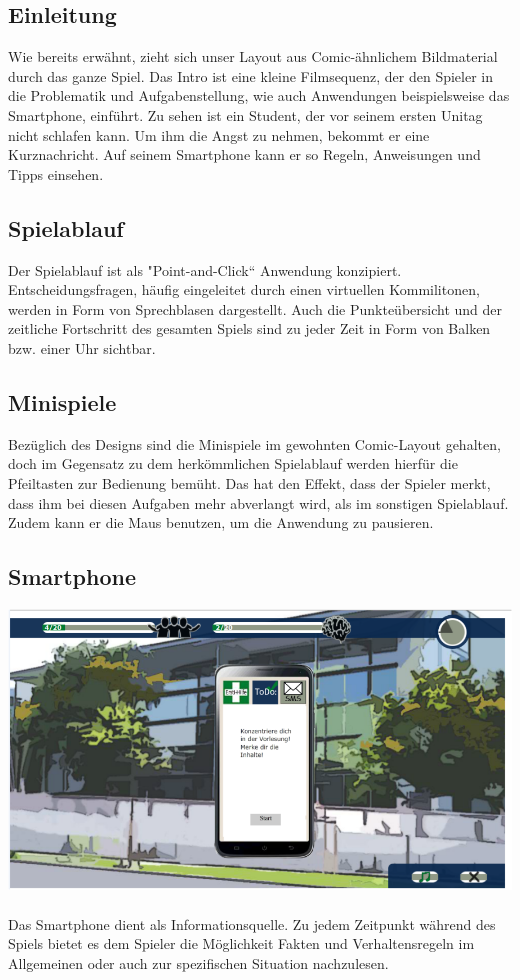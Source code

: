 \documentclass[a4paper, 11pt]{article} %
\begin{document}
\subsection{Einleitung}
Wie bereits erwähnt, zieht sich unser Layout aus Comic-ähnlichem Bildmaterial durch das ganze Spiel. Das Intro ist eine kleine Filmsequenz, der den Spieler in die Problematik und Aufgabenstellung, wie auch Anwendungen beispielsweise das Smartphone, einführt. Zu sehen ist ein Student, der vor seinem ersten Unitag nicht schlafen kann. Um ihm die Angst zu nehmen, bekommt er eine Kurznachricht. Auf seinem Smartphone kann er so Regeln, Anweisungen und Tipps einsehen.

\subsection{Spielablauf}
Der Spielablauf ist als "Point-and-Click“ Anwendung konzipiert. Entscheidungsfragen, häufig eingeleitet durch einen virtuellen Kommilitonen, werden in Form von Sprechblasen dargestellt.
Auch die Punkteübersicht und der zeitliche Fortschritt des gesamten Spiels sind zu jeder Zeit in Form von Balken bzw. einer Uhr sichtbar.

\subsection{Minispiele}
Bezüglich des Designs sind die Minispiele im gewohnten Comic-Layout gehalten, doch im Gegensatz zu dem herkömmlichen Spielablauf werden hierfür die Pfeiltasten zur Bedienung bemüht. Das hat den Effekt, dass der Spieler merkt, dass ihm bei diesen Aufgaben mehr abverlangt wird, als im sonstigen Spielablauf. Zudem kann er die Maus benutzen, um die Anwendung zu pausieren.

\subsection{Smartphone}
\includegraphics[scale=0.535]{images/spiel/4.png}\\\\
Das Smartphone dient als Informationsquelle. Zu jedem Zeitpunkt während des Spiels bietet es dem Spieler die Möglichkeit Fakten und Verhaltensregeln im Allgemeinen oder auch zur spezifischen Situation nachzulesen.
\end{document}
